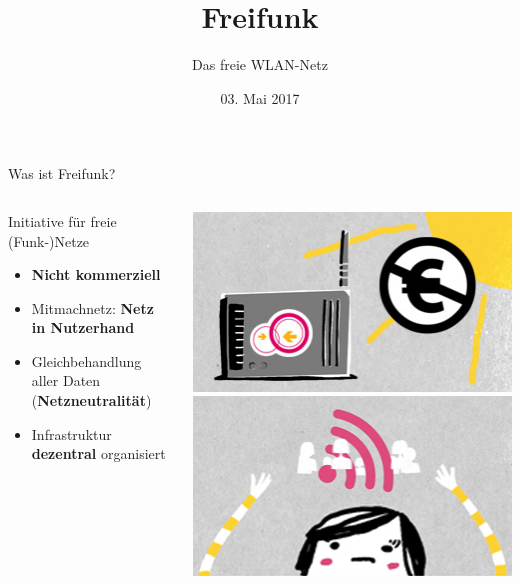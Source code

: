 \documentclass[t]{beamer}
\title{Freifunk}
\author{Das freie WLAN-Netz} %
\date{03. Mai 2017}
\begin{document}
  \maketitle

  \begin{frame}{Was ist Freifunk?}
    \begin{columns}
      \begin{column}{0.75\textwidth}
        \hspace{0.75em}\Large{Initiative für freie (Funk-)Netze}
        \vspace{1em}
        \begin{itemize}
          \item \textbf{Nicht kommerziell}
          \item Mitmachnetz: \textbf{Netz in Nutzerhand}
          \item Gleichbehandlung aller Daten (\textbf{Netzneutralität})
          \item Infrastruktur \textbf{dezentral} organisiert
        \end{itemize}
      \end{column}
      \begin{column}{0.25\textwidth}
        \begin{center}
          \includegraphics[width=\textwidth]{images/freifunk_insel_nc}\newline
          \includegraphics[width=\textwidth]{images/up}\newline

\end{center}
\end{column}
\end{columns}
\end{frame}
\end{document}
